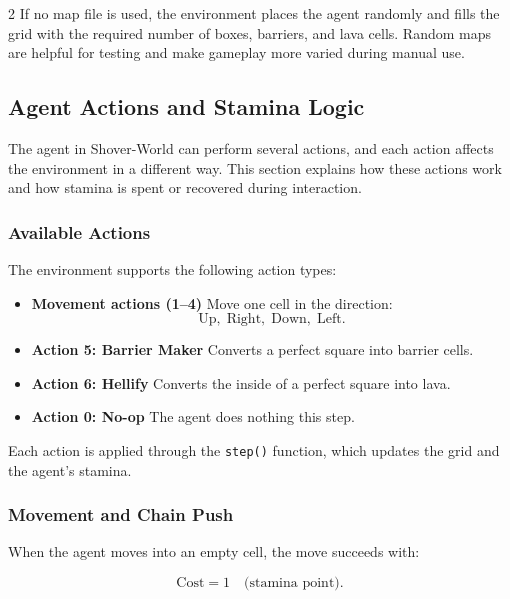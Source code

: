 \documentclass[a4paper]{article}
\begin{document}
\begin{multicols}{2}
If no map file is used, the environment places the agent randomly and fills the grid with the required number of boxes, barriers, and lava cells. Random maps are helpful for testing and make gameplay more varied during manual use.





\subsection{Agent Actions and Stamina Logic}

The agent in Shover-World can perform several actions, and each action affects the environment in a different way. This section explains how these actions work and how stamina is spent or recovered during interaction.

\subsubsection{Available Actions}

The environment supports the following action types:

\begin{itemize}[label=-]
    \item \textbf{Movement actions (1--4)}  
    Move one cell in the direction:
    \[
    \text{Up},\;\text{Right},\;\text{Down},\;\text{Left}.
    \]

    \item \textbf{Action 5: Barrier Maker}  
    Converts a perfect square into barrier cells.

    \item \textbf{Action 6: Hellify}  
    Converts the inside of a perfect square into lava.

    \item \textbf{Action 0: No-op}  
    The agent does nothing this step.
\end{itemize}

Each action is applied through the \texttt{step()} function, which updates the grid and the agent’s stamina.

\subsubsection{Movement and Chain Push}

When the agent moves into an empty cell, the move succeeds with:

\[
\text{Cost} = 1 \quad \text{(stamina point)}.
\]


\end{multicols}
\end{document}
